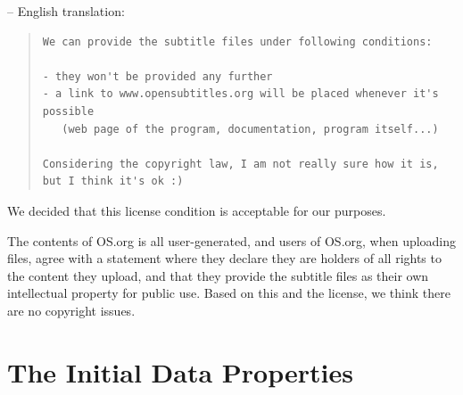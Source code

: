 \noindent -- English translation:

\begin{quote}
\begin{verbatim}
We can provide the subtitle files under following conditions:

- they won't be provided any further
- a link to www.opensubtitles.org will be placed whenever it's possible 
   (web page of the program, documentation, program itself...)

Considering the copyright law, I am not really sure how it is, 
but I think it's ok :)
\end{verbatim}
\end{quote}


\noindent We decided that this license condition is acceptable for our purposes. 

The contents of OS.org is all user-generated, and users of OS.org, when uploading files, agree with a statement where they declare they are holders of all rights to the content they upload, and that they provide the subtitle files as their own intellectual property for public use. Based on this and the license, we think there are no copyright issues.%


\section{The Initial Data Properties}
\label{sec:properties}
